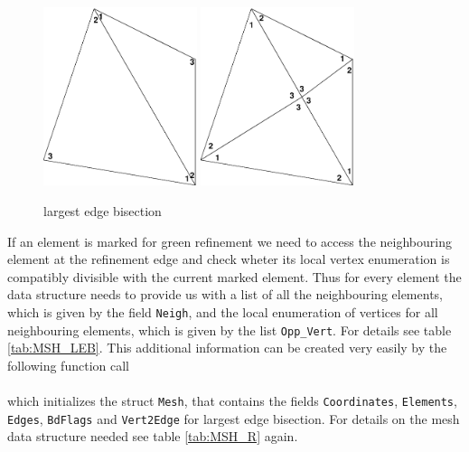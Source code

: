 \begin{figure}[htb]
  \centering
  \begin{minipage}[c]{0.7\textwidth}
    \includegraphics[width=0.4\textwidth]{LEB_org.eps} \hfill
    \includegraphics[width=0.4\textwidth]{LEB_ref.eps}
  \end{minipage}
  \caption{largest edge bisection}
  \label{fig:LEB}
\end{figure}

If an element is marked for green refinement we need to access the neighbouring element at the refinement edge and check
wheter its local vertex enumeration is compatibly divisible with the current marked element. Thus for every element the
data structure needs to provide us with a list of all the neighbouring elements, which is given by the field {\tt Neigh},
and the local enumeration of vertices for all neighbouring elements, which is given by the list {\tt Opp\_Vert}. For
details see table \ref{tab:MSH_LEB}. This additional information can be created very easily by the following function
call \\

 \\

\noindent which initializes the struct {\tt Mesh}, that contains the fields {\tt Coordinates}, {\tt Elements}, {\tt Edges},
{\tt BdFlags} and {\tt Vert2Edge} for largest edge bisection. For details on the mesh data structure needed see table
\ref{tab:MSH_R} again.

